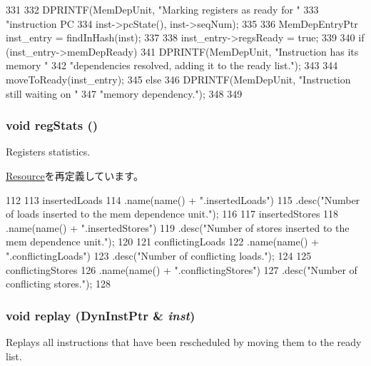\begin{DoxyCode}
331 {
332     DPRINTF(MemDepUnit, "Marking registers as ready for "
333             "instruction PC %
334             inst->pcState(), inst->seqNum);
335 
336     MemDepEntryPtr inst_entry = findInHash(inst);
337 
338     inst_entry->regsReady = true;
339 
340     if (inst_entry->memDepReady) {
341         DPRINTF(MemDepUnit, "Instruction has its memory "
342                 "dependencies resolved, adding it to the ready list.\n");
343 
344         moveToReady(inst_entry);
345     } else {
346         DPRINTF(MemDepUnit, "Instruction still waiting on "
347                 "memory dependency.\n");
348     }
349 }
\end{DoxyCode}
\hypertarget{classMemDepUnit_a4dc637449366fcdfc4e764cdf12d9b11}{
\subsubsection[{regStats}]{\setlength{\rightskip}{0pt plus 5cm}void regStats ()}}
\label{classMemDepUnit_a4dc637449366fcdfc4e764cdf12d9b11}
Registers statistics. 

\hyperlink{classResource_ac1739a9be0fbd5d96cf441cd3b2c1c78}{Resource}を再定義しています。


\begin{DoxyCode}
112 {
113     insertedLoads
114         .name(name() + ".insertedLoads")
115         .desc("Number of loads inserted to the mem dependence unit.");
116 
117     insertedStores
118         .name(name() + ".insertedStores")
119         .desc("Number of stores inserted to the mem dependence unit.");
120 
121     conflictingLoads
122         .name(name() + ".conflictingLoads")
123         .desc("Number of conflicting loads.");
124 
125     conflictingStores
126         .name(name() + ".conflictingStores")
127         .desc("Number of conflicting stores.");
128 }
\end{DoxyCode}
\hypertarget{classMemDepUnit_ace9b968c62d08a19c21a17b57bfb52fe}{
\subsubsection[{replay}]{\setlength{\rightskip}{0pt plus 5cm}void replay ({\bf DynInstPtr} \& {\em inst})}}
\label{classMemDepUnit_ace9b968c62d08a19c21a17b57bfb52fe}
Replays all instructions that have been rescheduled by moving them to the ready list. 


